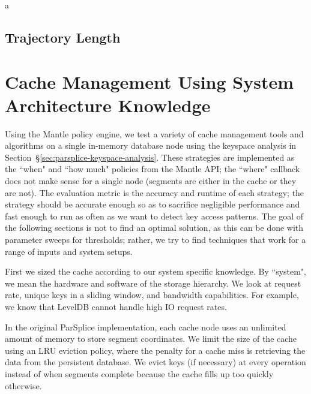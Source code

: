 a\subsection{Trajectory Length}
%
%
%
%

\section{Cache Management Using System Architecture Knowledge}
\label{sec:arch-specific}

Using the Mantle policy engine, we test a variety of cache management tools and
algorithms on a single in-memory database node using the keyspace analysis in
Section~\S\ref{sec:parsplice-keyspace-analysis}. These strategies are
implemented as the ``when" and ``how much" policies from the Mantle API; the
``where" callback does not make sense for a single node (segments are either in
the cache or they are not). The evaluation metric is the accuracy and runtime
of each strategy; the strategy should be accurate enough so as to sacrifice
negligible performance and fast enough to run as often as we want to detect key
access patterns. The goal of the following sections is not to find an optimal
solution, as this can be done with parameter sweeps for thresholds; rather, we
try to find techniques that work for a range of inputs and system setups.

First we sized the cache according to our system specific knowledge. By
``system", we mean the hardware and software of the storage hierarchy. We look
at request rate, unique keys in a sliding window, and bandwidth capabilities. For
example, we know that LevelDB cannot handle high IO request rates.

In the original ParSplice implementation, each cache node uses an unlimited
amount of memory to store segment coordinates. We limit the size of the cache
using an LRU eviction policy, where the penalty for a cache miss is retrieving
the data from the persistent database.  We evict keys (if necessary) at every
operation instead of when segments complete because the cache fills up too
quickly otherwise.

